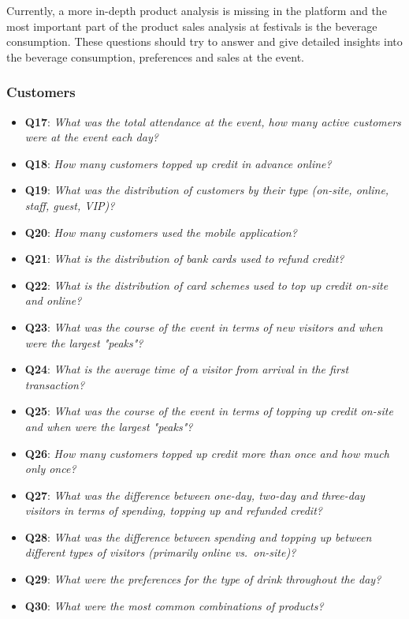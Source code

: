 Currently, a more in-depth product analysis is missing in the platform and the most important part of the product sales analysis at festivals is the beverage consumption.
These questions should try to answer and give detailed insights into the beverage consumption, preferences and sales at the event.

\subsubsection*{Customers}
\begin{itemize}
	\item \textbf{Q17}: \textit{What was the total attendance at the event, how many active customers were at the event each day?}
	\item \textbf{Q18}: \textit{How many customers topped up credit in advance online?}
	\item \textbf{Q19}: \textit{What was the distribution of customers by their type (on-site, online, staff, guest, VIP)?}
	\item \textbf{Q20}: \textit{How many customers used the mobile application?}
	\item \textbf{Q21}: \textit{What is the distribution of bank cards used to refund credit?}
	\item \textbf{Q22}: \textit{What is the distribution of card schemes used to top up credit on-site and online?}
	\item \textbf{Q23}: \textit{What was the course of the event in terms of new visitors and when were the largest "peaks"?}
	\item \textbf{Q24}: \textit{What is the average time of a visitor from arrival in the first transaction?}
	\item \textbf{Q25}: \textit{What was the course of the event in terms of topping up credit on-site and when were the largest "peaks"?}
	\item \textbf{Q26}: \textit{How many customers topped up credit more than once and how much only once?}
	\item \textbf{Q27}: \textit{What was the difference between one-day, two-day and three-day visitors in terms of spending, topping up and refunded credit?}
	\item \textbf{Q28}: \textit{What was the difference between spending and topping up between different types of visitors (primarily online vs.\ on-site)?}
	\item \textbf{Q29}: \textit{What were the preferences for the type of drink throughout the day?}
	\item \textbf{Q30}: \textit{What were the most common combinations of products?}
\end{itemize}

